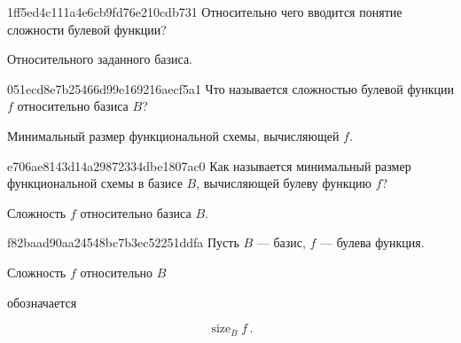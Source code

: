 \begin{note}{1ff5ed4c111a4e6cb9fd76e210cdb731}
    Относительно чего вводится понятие сложности булевой функции?

    \begin{cloze}{1}
        Относительного заданного базиса.
    \end{cloze}
\end{note}

\begin{note}{051ecd8e7b25466d99e169216aecf5a1}
    Что называется сложностью булевой функции \({ f }\) относительно базиса \({ B }\)?

    \begin{cloze}{1}
        Минимальный размер функциональной схемы, вычисляющей \({ f }\).
    \end{cloze}
\end{note}

\begin{note}{e706ae8143d14a29872334dbe1807ac0}
    Как называется минимальный размер функциональной схемы в базисе \({ B }\), вычисляющей булеву функцию \({ f }\)?

    \begin{cloze}{1}
        Сложность \({ f }\) относительно базиса \({ B }\).
   \end{cloze}
\end{note}

\begin{note}{f82baad90aa24548bc7b3ec52251ddfa}
    Пусть \({ B }\) --- базис, \({ f }\) --- булева функция.
    \begin{icloze}{2}Сложность \({ f }\) относительно \({ B }\)\end{icloze} обозначается
    \begin{icloze}{1}
        \[
            \operatorname{size}_B f\,.
        \]
    \end{icloze}
\end{note}


